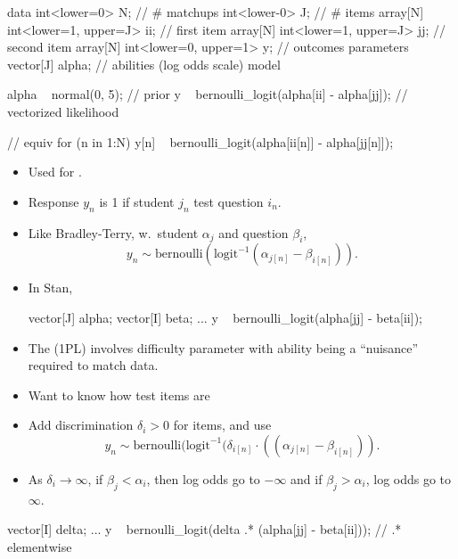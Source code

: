 \documentclass[10pt]{report}
\begin{document}
\begin{stancode}
data {
  int<lower=0> N;                       // # matchups
  int<lower-0> J;                       // # items
  array[N] int<lower=1, upper=J> ii;    // first item
  array[N] int<lower=1, upper=J> jj;    // second item
  array[N] int<lower=0, upper=1> y;     // outcomes
}
parameters {
  vector[J] alpha;                      // abilities (log odds scale)
}
model {
  alpha ~ normal(0, 5);                        // prior
  y ~ bernoulli_logit(alpha[ii] - alpha[jj]);  // vectorized likelihood

  // equiv for (n in 1:N) y[n] ~ bernoulli_logit(alpha[ii[n]] - alpha[jj[n]]);
}  
\end{stancode}


\begin{itemize}
\item Used for .
\item Response $y_n$ is 1 if student $j_n$  test question $i_n$.
\item Like Bradley-Terry, w.\ student  $\alpha_j$ and question  $\beta_i$,
  $$
  y_n \sim \textrm{bernoulli}(\textrm{logit}^{-1}(\alpha_{j[n]} - \beta_{i[n]})).
  $$
\item In Stan,
  \begin{stancode}
    vector[J] alpha;  vector[I] beta; 
    ... 
    y ~ bernoulli_logit(alpha[jj] - beta[ii]); 
  \end{stancode}
\item The  (1PL) involves difficulty parameter with ability being a ``nuisance'' required to match data.
\end{itemize}

\begin{itemize}
\item Want to know how  test items are
\item Add discrimination $\delta_i > 0$ for items, and use
  $$
  y_n \sim \textrm{bernoulli}(\textrm{logit}^{-1}(\delta_{i[n]} \cdot ((\alpha_{j[n]} - \beta_{i[n]})).
  $$
\item As $\delta_i \rightarrow \infty$, if $\beta_j < \alpha_i$, then log odds go to $-\infty$ and if $\beta_j > \alpha_i$, log odds go to $\infty$.
\end{itemize}
\begin{stancode}
vector[I] delta;
... 
y ~ bernoulli_logit(delta .* (alpha[jj] - beta[ii]));  // .* elementwise
\end{stancode}
\end{document}
